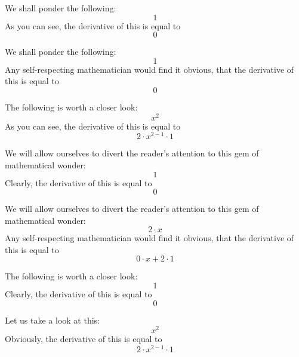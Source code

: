 \documentclass{article}
\begin{document}
We shall ponder the following:
\begin{equation}
1 
\end{equation}
As you can see, the derivative of this is equal to
\begin{equation}
0 
\end{equation}

We shall ponder the following:
\begin{equation}
1 
\end{equation}
Any self-respecting mathematician would find it obvious, that the derivative of this is equal to
\begin{equation}
0 
\end{equation}

The following is worth a closer look:
\begin{equation}
x ^{2 } 
\end{equation}
As you can see, the derivative of this is equal to
\begin{equation}
2 \cdot x ^{2 - 1 } \cdot 1 
\end{equation}

We will allow ourselves to divert the reader's attention to this gem of mathematical wonder:
\begin{equation}
1 
\end{equation}
Clearly, the derivative of this is equal to
\begin{equation}
0 
\end{equation}

We will allow ourselves to divert the reader's attention to this gem of mathematical wonder:
\begin{equation}
2 \cdot x 
\end{equation}
Any self-respecting mathematician would find it obvious, that the derivative of this is equal to
\begin{equation}
0 \cdot x + 2 \cdot 1 
\end{equation}

The following is worth a closer look:
\begin{equation}
1 
\end{equation}
Clearly, the derivative of this is equal to
\begin{equation}
0 
\end{equation}

Let us take a look at this:
\begin{equation}
x ^{2 } 
\end{equation}
Obviously, the derivative of this is equal to
\begin{equation}
2 \cdot x ^{2 - 1 } \cdot 1 
\end{equation}
\end{document}
